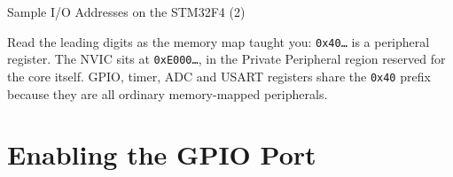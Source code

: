 \documentclass[9pt,aspectratio=169,xcolor=table]{beamer}
\begin{document}
\begin{frame}{Sample I/O Addresses on the STM32F4 (2)}
    \leavevmode
    \begin{center}
    \end{center}

    \vspace{3mm}
    {\small Read the leading digits as the memory map taught you: \alert{\texttt{0x40\ldots}} is a peripheral register. The NVIC sits at \texttt{0xE000\ldots}, in the Private Peripheral region reserved for the core itself. GPIO, timer, ADC and USART registers share the \texttt{0x40} prefix because they are all ordinary memory-mapped peripherals.}
\end{frame}


\section{Enabling the GPIO Port}
\end{document}
